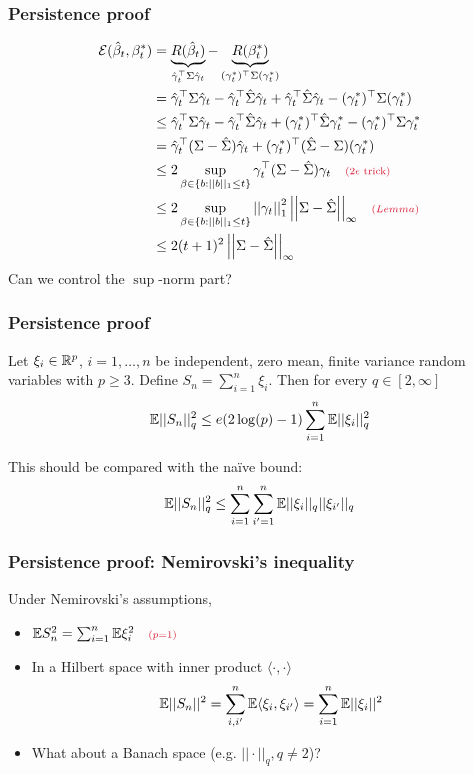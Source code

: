 \documentclass[12pt]{beamer}
\newcommand{\parenthetical}[2]{#1  \scriptstyle \alr{( #2)}}
\begin{document}
  \begin{frame}
  \frametitle{Persistence proof}
  \begin{align}
  \mathcal{E}(\hat\beta_t,\beta_t^*) 
  & = 
  \underbrace{R(\hat\beta_t)}_{ \hat\gamma_t^{\top} \Sigma \hat\gamma_t } - 
  \underbrace{R(\beta_t^*)}_{ (\gamma_t^*)^{\top} \Sigma  (\gamma_t^*)} \\
  & = 
  \hat\gamma_t^{\top} \Sigma \hat\gamma_t - \hat\gamma_t^{\top} \hat\Sigma \hat\gamma_t 
  +  \hat\gamma_t^{\top} \hat\Sigma \hat\gamma_t -  (\gamma_t^*)^{\top} \Sigma  (\gamma_t^*) \\
  & \leq
  \hat\gamma_t^{\top} \Sigma \hat\gamma_t - \hat\gamma_t^{\top} \hat\Sigma \hat\gamma_t 
  +   (\gamma_t^*)^{\top} \hat\Sigma  \gamma_t^* -  (\gamma_t^*)^{\top} \Sigma  \gamma_t^*\\  
  & =
  \hat\gamma_t^{\top} (\Sigma - \hat\Sigma) \hat\gamma_t 
  +  (\gamma_t^*)^{\top}( \hat\Sigma  - \Sigma) (\gamma_t^*) \\
  & \leq
  2\sup_{\beta \in \{b : ||b||_1 \leq t\}} \gamma_t^{\top} (\Sigma - \hat\Sigma) \gamma_t  \parenthetical{\quad}{2\epsilon \textrm{ trick}}\\
  & \leq   
  2\sup_{\beta \in \{b : ||b||_1 \leq t\}} \norm{\gamma_t}_1^2 \norm{\Sigma - \hat\Sigma}_{\infty} 
  \parenthetical{\quad}{Lemma} \\
  & \leq   
  2(t+1)^2 \norm{\Sigma - \hat\Sigma}_{\infty}   
    \end{align}
Can we control the $\sup$-norm part?
\end{frame}


  \begin{frame}
  \frametitle{Persistence proof}
  Let $\xi_i  \in \mathbb{R}^p$, $i=1,\ldots,n$ be independent, zero mean, finite variance
random variables with $p \geq 3$.  Define $S_n = \sum_{i=1}^n \xi_i$. 
Then for every $q \in [2,\infty]$
\[
\mathbb{E} ||S_n ||_q^2 \leq e(2\log(p)-1)  \sum_{i=1}^n \mathbb{E} ||\xi_i||_q^2
\]

\vsp

This should be compared with the na\"ive bound:
\[
\mathbb{E} ||S_n ||_q^2 \leq \sum_{i=1}^n\sum_{i'=1}^n \mathbb{E} ||\xi_i||_q||\xi_{i'}||_q
\]
\end{frame}
  \begin{frame}
  \frametitle{Persistence proof: Nemirovski's inequality}

 Under Nemirovski's assumptions, 
\begin{itemize}
\item $\E S_n^2 = \sum_{i=1}^n \E\xi_i^2 \parenthetical{\quad}{p=1}$
\item In a Hilbert space with inner product $\langle \cdot, \cdot \rangle$
\[
\mathbb{E} ||S_n||^2 = \sum_{i,i'}^n \mathbb{E} \langle \xi_i, \xi_{i'} \rangle = \sum_{i=1}^n \mathbb{E} ||\xi_i||^2
\]
\item What about a Banach space (e.g. $||\cdot||_q, q \neq 2$)?
\end{itemize}
\end{frame}
\end{document}
